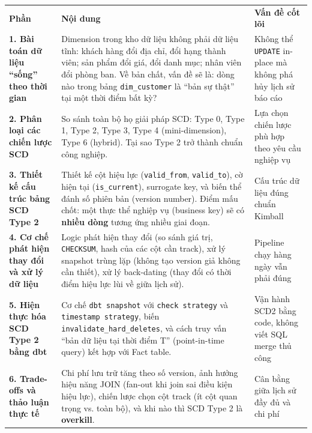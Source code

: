 \documentclass[12pt]{article}
\begin{document}
\noindent
\begin{longtable}{@{}>{\RaggedRight\arraybackslash}p{3.1cm}>{\RaggedRight\arraybackslash}p{8.3cm}>{\RaggedRight\arraybackslash}p{4.3cm}@{}}
\rowcolor{rowLavender}
\textbf{Phần} & \textbf{Nội dung} & \textbf{Vấn đề cốt lõi} \\
\addlinespace[3pt]
\endhead

\textbf{1. Bài toán dữ liệu ``sống'' theo thời gian} 
& Dimension trong kho dữ liệu không phải dữ liệu tĩnh: khách hàng đổi địa chỉ, đổi hạng thành viên; sản phẩm đổi giá, đổi danh mục; nhân viên đổi phòng ban. Về bản chất, vấn đề sẽ là: dòng nào trong bảng \texttt{dim\_customer} là ``bản sự thật'' tại một thời điểm bất kỳ?
& Không thể \texttt{UPDATE} in-place mà không phá hủy lịch sử báo cáo \\
\addlinespace[6pt]

\textbf{2. Phân loại các chiến lược SCD}
& So sánh toàn bộ họ giải pháp SCD: Type 0, Type 1, Type 2, Type 3, Type 4 (mini-dimension), Type 6 (hybrid). Tại sao Type 2 trở thành chuẩn công nghiệp.
& Lựa chọn chiến lược phù hợp theo yêu cầu nghiệp vụ \\
\addlinespace[6pt]

\textbf{3. Thiết kế cấu trúc bảng SCD Type 2}
& Thiết kế cột hiệu lực (\texttt{valid\_from}, \texttt{valid\_to}), cờ hiện tại (\texttt{is\_current}), surrogate key, và biến thể đánh số phiên bản (version number). Điểm mấu chốt: một thực thể nghiệp vụ (business key) sẽ có \textbf{nhiều dòng} tương ứng nhiều giai đoạn.
& Cấu trúc dữ liệu đúng chuẩn Kimball \\
\addlinespace[6pt]

\textbf{4. Cơ chế phát hiện thay đổi và xử lý dữ liệu}
& Logic phát hiện thay đổi (so sánh giá trị, \texttt{CHECKSUM}, hash của các cột cần track), xử lý snapshot trùng lặp (không tạo version giả không cần thiết), xử lý back-dating (thay đổi có thời điểm hiệu lực lùi về giữa lịch sử).
& Pipeline chạy hàng ngày vẫn phải đúng \\
\addlinespace[6pt]

\textbf{5. Hiện thực hóa SCD Type 2 bằng dbt}
& Cơ chế \texttt{dbt snapshot} với \texttt{check strategy} và \texttt{timestamp strategy}, biến \texttt{invalidate\_hard\_deletes}, và cách truy vấn ``bản dữ liệu tại thời điểm T'' (point-in-time query) kết hợp với Fact table.
& Vận hành SCD2 bằng code, không viết SQL merge thủ công \\
\addlinespace[6pt]

\textbf{6. Trade-offs và thảo luận thực tế}
& Chi phí lưu trữ tăng theo số version, ảnh hưởng hiệu năng JOIN (fan-out khi join sai điều kiện hiệu lực), chiến lược chọn cột track (ít cột quan trọng vs. toàn bộ), và khi nào thì SCD Type 2 là \textbf{overkill}.
& Cân bằng giữa lịch sử đầy đủ và chi phí \\
\end{longtable}
\end{document}
